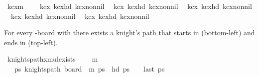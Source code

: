 \begin{isabellebody}
\isanewline
{}\isamarkupfalse%
\ kc{\isacharunderscore}{\kern0pt}{}xm\ {\isacharequal}{\kern0pt}\ \isanewline
\ \ kc{\isacharunderscore}{\kern0pt}{}x{}\ kc{\isacharunderscore}{\kern0pt}{}x{}{\isacharunderscore}{\kern0pt}hd\ kc{\isacharunderscore}{\kern0pt}{}x{}{\isacharunderscore}{\kern0pt}non{\isacharunderscore}{\kern0pt}nil\isanewline
\ \ kc{\isacharunderscore}{\kern0pt}{}x{}\ kc{\isacharunderscore}{\kern0pt}{}x{}{\isacharunderscore}{\kern0pt}hd\ kc{\isacharunderscore}{\kern0pt}{}x{}{\isacharunderscore}{\kern0pt}non{\isacharunderscore}{\kern0pt}nil\isanewline
\ \ kc{\isacharunderscore}{\kern0pt}{}x{}\ kc{\isacharunderscore}{\kern0pt}{}x{}{\isacharunderscore}{\kern0pt}hd\ kc{\isacharunderscore}{\kern0pt}{}x{}{\isacharunderscore}{\kern0pt}non{\isacharunderscore}{\kern0pt}nil\isanewline
\ \ kc{\isacharunderscore}{\kern0pt}{}x{}\ kc{\isacharunderscore}{\kern0pt}{}x{}{\isacharunderscore}{\kern0pt}hd\ kc{\isacharunderscore}{\kern0pt}{}x{}{\isacharunderscore}{\kern0pt}non{\isacharunderscore}{\kern0pt}nil\isanewline
\ \ kc{\isacharunderscore}{\kern0pt}{}x{}\ kc{\isacharunderscore}{\kern0pt}{}x{}{\isacharunderscore}{\kern0pt}hd\ kc{\isacharunderscore}{\kern0pt}{}x{}{\isacharunderscore}{\kern0pt}non{\isacharunderscore}{\kern0pt}nil%
\begin{isamarkuptext}%
For every -board with  there exists a knight's path that starts in 
 (bottom-left) and ends in  (top-left).%
\end{isamarkuptext}\isamarkuptrue%
\isamarkupfalse%
\ knights{\isacharunderscore}{\kern0pt}path{\isacharunderscore}{\kern0pt}{}xm{\isacharunderscore}{\kern0pt}ul{\isacharunderscore}{\kern0pt}exists{\isacharcolon}{\kern0pt}\ \isanewline
\ \ \ {\isachardoublequoteopen}m\ {\isasymge}\ {}{\isachardoublequoteclose}\ \isanewline
\ \ \ {\isachardoublequoteopen}{\isasymexists}ps{\isachardot}{\kern0pt}\ knights{\isacharunderscore}{\kern0pt}path\ {\isacharparenleft}{\kern0pt}board\ {}\ m{\isacharparenright}{\kern0pt}\ ps\ {\isasymand}\ hd\ ps\ {\isacharequal}{\kern0pt}\ {\isacharparenleft}{\kern0pt}{}{\isacharcomma}{\kern0pt}{}{\isacharparenright}{\kern0pt}\ {\isasymand}\ last\ ps\ {\isacharequal}{\kern0pt}\ {\isacharparenleft}{\kern0pt}{}{\isacharcomma}{\kern0pt}{}{\isacharparenright}{\kern0pt}{\isachardoublequoteclose}\isanewline

\end{isabellebody}
